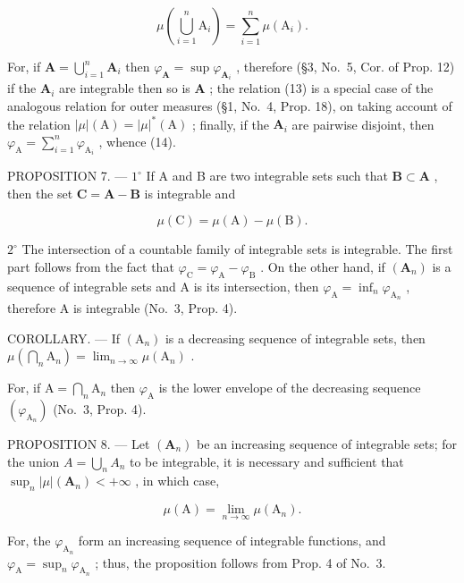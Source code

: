 \[
\mu \left(\bigcup_ {i = 1} ^ {n} \mathrm{A} _ {i}\right) = \sum_ {i = 1} ^ {n} \mu (\mathrm{A} _ {i}).\tag{14}
\]

For, if \(\mathbf{A} = \bigcup_{i=1}^{n} \mathbf{A}_i\) then \(\varphi_{\mathbf{A}} = \sup \varphi_{\mathbf{A}_i}\) , therefore (§3, No.~5, Cor. of Prop. 12) if the \(\mathbf{A}_i\) are integrable then so is \(\mathbf{A}\) ; the relation (13) is a special case of the analogous relation for outer measures (§1, No.~4, Prop. 18), on taking account of the relation \(|\mu|(\mathrm{A}) = |\mu|^*(\mathrm{A})\) ; finally, if the \(\mathbf{A}_i\) are pairwise disjoint, then \(\varphi_{\mathrm{A}} = \sum_{i=1}^{n} \varphi_{\mathrm{A}_i}\) , whence (14).

PROPOSITION 7. --- \(1^{\circ}\) If A and B are two integrable sets such that \(\mathbf{B} \subset \mathbf{A}\) , then the set \(\mathbf{C} = \mathbf{A} - \mathbf{B}\) is integrable and

\[
\mu (\mathrm{C}) = \mu (\mathrm{A}) - \mu (\mathrm{B}).\tag{15}
\]

\(2^{\circ}\) The intersection of a countable family of integrable sets is integrable. The first part follows from the fact that \(\varphi_{\mathrm{C}} = \varphi_{\mathrm{A}} - \varphi_{\mathrm{B}}\) . On the other hand, if \((\mathbf{A}_n)\) is a sequence of integrable sets and A is its intersection, then \(\varphi_{\mathrm{A}} = \inf_{n} \varphi_{\mathrm{A}_n}\) , therefore A is integrable (No.~3, Prop. 4).

COROLLARY. --- If \((\mathrm{A}_{n})\) is a decreasing sequence of integrable sets, then \(\mu(\bigcap_{n}\mathrm{A}_{n})=\lim_{n\to\infty}\mu(\mathrm{A}_{n})\) .

For, if \(\mathrm{A} = \bigcap_{n}\mathrm{A}_{n}\) then \(\varphi_{\mathrm{A}}\) is the lower envelope of the decreasing sequence \((\varphi_{\mathrm{A}_n})\) (No.~3, Prop. 4).

PROPOSITION 8. --- Let \((\mathbf{A}_{n})\) be an increasing sequence of integrable sets; for the union \(A = \bigcup_{n} A_{n}\) to be integrable, it is necessary and sufficient that \(\sup_{n} |\mu|(\mathbf{A}_{n}) < +\infty\) , in which case,

\[
\mu (\mathrm{A}) = \lim _ {n \rightarrow \infty} \mu (\mathrm{A} _ {n}).\tag{16}
\]

For, the \(\varphi_{\mathrm{A}_n}\) form an increasing sequence of integrable functions, and \(\varphi_{\mathrm{A}} = \sup_n \varphi_{\mathrm{A}_n}\) ; thus, the proposition follows from Prop. 4 of No.~3.


